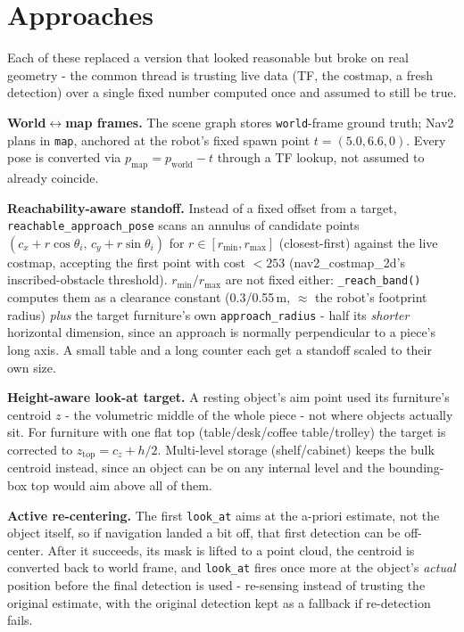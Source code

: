 \documentclass[11pt]{article}
\begin{document}
\section*{Approaches}

Each of these replaced a version that looked reasonable but broke on real geometry -
the common thread is trusting live data (TF, the costmap, a fresh detection) over a
single fixed number computed once and assumed to still be true.

\textbf{World$\leftrightarrow$map frames.} The scene graph stores \texttt{world}-frame
ground truth; Nav2 plans in \texttt{map}, anchored at the robot's fixed spawn point
$t=(5.0,6.6,0)$. Every pose is converted via $p_{\text{map}} = p_{\text{world}} - t$
through a TF lookup, not assumed to already coincide.

\textbf{Reachability-aware standoff.} Instead of a fixed offset from a target,
\texttt{reachable\_approach\_pose} scans an annulus of candidate points
$(c_x + r\cos\theta_i,\, c_y + r\sin\theta_i)$ for $r\in[r_{\min},r_{\max}]$
(closest-first) against the live costmap, accepting the first point with cost
$<253$ (nav2\_costmap\_2d's inscribed-obstacle threshold). $r_{\min}/r_{\max}$ are
not fixed either: \texttt{\_reach\_band()} computes them as a clearance constant
(0.3/0.55\,m, $\approx$ the robot's footprint radius) \emph{plus} the target
furniture's own \texttt{approach\_radius} - half its \emph{shorter} horizontal
dimension, since an approach is normally perpendicular to a piece's long axis. A
small table and a long counter each get a standoff scaled to their own size.

\textbf{Height-aware look-at target.} A resting object's aim point used its
furniture's centroid $z$ - the volumetric middle of the whole piece - not where
objects actually sit. For furniture with one flat top (table/desk/coffee
table/trolley) the target is corrected to $z_{\text{top}} = c_z + h/2$. Multi-level
storage (shelf/cabinet) keeps the bulk centroid instead, since an object can be on
any internal level and the bounding-box top would aim above all of them.

\textbf{Active re-centering.} The first \texttt{look\_at} aims at the a-priori
estimate, not the object itself, so if navigation landed a bit off, that first
detection can be off-center. After it succeeds, its mask is lifted to a point cloud,
the centroid is converted back to world frame, and \texttt{look\_at} fires once more
at the object's \emph{actual} position before the final detection is used - re-sensing
instead of trusting the original estimate, with the original detection kept as a
fallback if re-detection fails.
\end{document}
